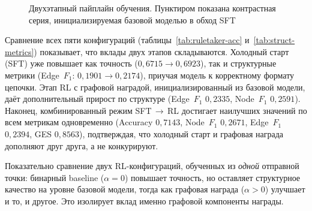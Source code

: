 \begin{figure}[H]
\centering
{}
\caption{Двухэтапный пайплайн обучения. Пунктиром показана контрастная серия, инициализируемая базовой моделью в обход SFT}
\label{fig:sft-rl}
\end{figure}

Сравнение всех пяти конфигураций (таблицы~\ref{tab:ruletaker-acc} и~\ref{tab:struct-metrics}) показывает, что вклады двух этапов складываются. Холодный старт (SFT) уже повышает как точность ($0{,}6715 \to 0{,}6923$), так и структурные метрики (Edge~$F_1$: $0{,}1901 \to 0{,}2174$), приучая модель к корректному формату цепочки. Этап RL с графовой наградой, инициализированный из базовой модели, даёт дополнительный прирост по структуре (Edge~$F_1$ $0{,}2335$, Node~$F_1$ $0{,}2591$). Наконец, комбинированный режим SFT\,$\to$\,RL достигает наилучших значений по всем метрикам одновременно (Accuracy $0{,}7143$, Node~$F_1$ $0{,}2671$, Edge~$F_1$ $0{,}2394$, GES $0{,}8563$), подтверждая, что холодный старт и графовая награда дополняют друг друга, а не конкурируют.

Показательно сравнение двух RL-конфигураций, обученных из \emph{одной} отправной точки: бинарный baseline ($\alpha=0$) повышает точность, но оставляет структурное качество на уровне базовой модели, тогда как графовая награда ($\alpha>0$) улучшает и то, и другое. Это изолирует вклад именно графовой компоненты награды.


